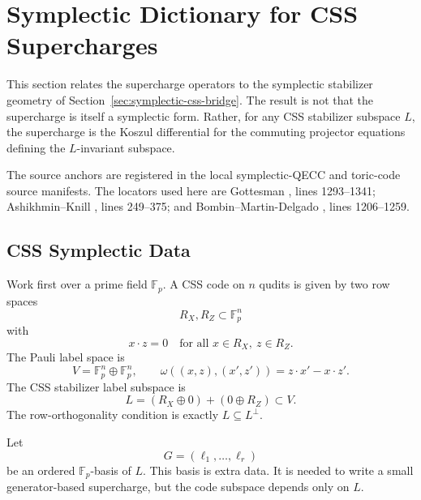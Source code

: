 
\section{Symplectic Dictionary for CSS Supercharges}
\label{sec:symplectic-supercharge-dictionary}

This section relates the supercharge operators to the symplectic stabilizer
geometry of Section~\ref{sec:symplectic-css-bridge}. The result is not that
the supercharge is itself a symplectic form. Rather, for any CSS stabilizer
subspace \(L\), the supercharge is the Koszul differential for the commuting
projector equations defining the \(L\)-invariant subspace.

The source anchors are registered in the local symplectic-QECC and toric-code
source manifests. The locators used here are Gottesman , lines
1293--1341; Ashikhmin--Knill , lines 249--375; and
Bombin--Martin-Delgado , lines
1206--1259.

\subsection{CSS Symplectic Data}

Work first over a prime field \(\mathbb F_p\). A CSS code on \(n\) qudits is
given by two row spaces
\[
  R_X,R_Z\subset \mathbb F_p^n
\]
with
\[
  x\cdot z=0\quad\text{for all }x\in R_X,\ z\in R_Z.
\]
The Pauli label space is
\[
  V=\mathbb F_p^n\oplus\mathbb F_p^n,
  \qquad
  \omega((x,z),(x',z'))=z\cdot x'-x\cdot z'.
\]
The CSS stabilizer label subspace is
\[
  L=(R_X\oplus 0)+(0\oplus R_Z)\subset V.
\]
The row-orthogonality condition is exactly \(L\subseteq L^\perp\).

Let
\[
  G=(\ell_1,\ldots,\ell_r)
\]
be an ordered \(\mathbb F_p\)-basis of \(L\). This basis is extra data. It is
needed to write a small generator-based supercharge, but the code subspace
depends only on \(L\).

